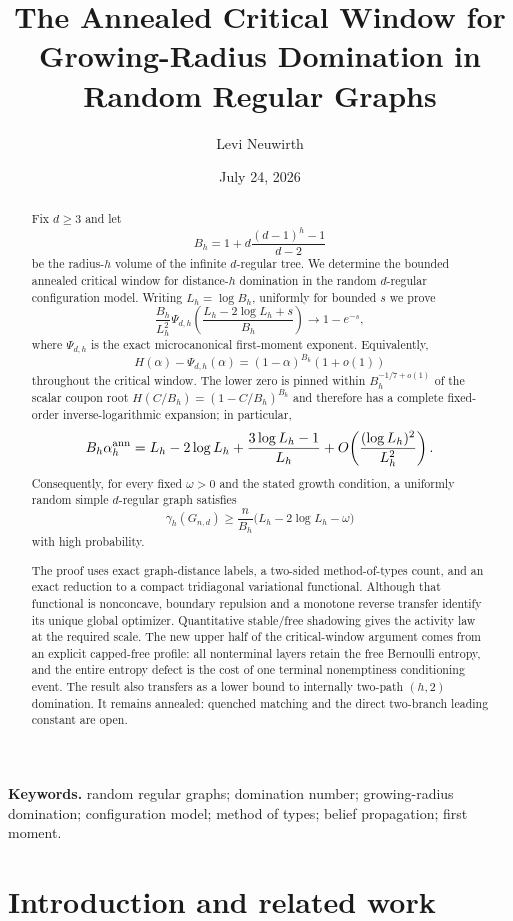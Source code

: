 \documentclass[11pt]{amsart}
\title[The Annealed Critical Window for Growing-Radius Domination]{The Annealed Critical Window for\\Growing-Radius Domination in Random Regular Graphs}
\author{Levi Neuwirth}
\date{July 24, 2026}
\theoremstyle{definition}
\begin{document}
\begin{abstract}
Fix $d\ge3$ and let
\[
 B_h=1+d\frac{(d-1)^h-1}{d-2}
\]
be the radius-$h$ volume of the infinite $d$-regular tree.  We determine the bounded annealed critical window for distance-$h$ domination in the random $d$-regular configuration model.  Writing $L_h=\log B_h$, uniformly for bounded $s$ we prove
\[
 \frac{B_h}{L_h^2}
 \Psi_{d,h}\!\left(
 \frac{L_h-2\log L_h+s}{B_h}
 \right)
 \longrightarrow 1-e^{-s},
\]
where $\Psi_{d,h}$ is the exact microcanonical first-moment exponent.  Equivalently,
\[
 H(\alpha)-\Psi_{d,h}(\alpha)
 =(1-\alpha)^{B_h}(1+o(1))
\]
throughout the critical window.  The lower zero is pinned within
$B_h^{-1/7+o(1)}$ of the scalar coupon root
$H(C/B_h)=(1-C/B_h)^{B_h}$ and therefore has a complete fixed-order inverse-logarithmic expansion; in particular,
\[
 B_h\alpha_h^{\rm ann}
 =L_h-2\log L_h
 +\frac{3\log L_h-1}{L_h}
 +O\!\left(\frac{(\log L_h)^2}{L_h^2}\right).
\]
Consequently, for every fixed $\omega>0$ and the stated growth condition, a uniformly random simple $d$-regular graph satisfies
\[
 \gamma_h(G_{n,d})\ge
 \frac n{B_h}
 \bigl(L_h-2\log L_h-\omega\bigr)
\]
with high probability.

The proof uses exact graph-distance labels, a two-sided method-of-types count, and an exact reduction to a compact tridiagonal variational functional.  Although that functional is nonconcave, boundary repulsion and a monotone reverse transfer identify its unique global optimizer.  Quantitative stable/free shadowing gives the activity law at the required scale.  The new upper half of the critical-window argument comes from an explicit capped-free profile: all nonterminal layers retain the free Bernoulli entropy, and the entire entropy defect is the cost of one terminal nonemptiness conditioning event.  The result also transfers as a lower bound to internally two-path $(h,2)$ domination.  It remains annealed: quenched matching and the direct two-branch leading constant are open.
\end{abstract}

\maketitle

\noindent\textbf{Keywords.} random regular graphs; domination number; growing-radius domination; configuration model; method of types; belief propagation; first moment.

\section{Introduction and related work}\label{sec:intro}
\end{document}

